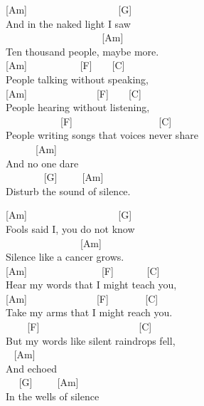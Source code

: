 \documentclass[
  letterpaper,
]{scrbook}
\begin{document}
{[}Am{]} ~ ~ ~ ~ ~ ~ ~ ~ ~ ~ ~{[}G{]}\\
And in the naked light I saw\\
\hspace*{0.333em} ~ ~ ~ ~ ~ ~ ~ ~ ~ ~ ~ ~{[}Am{]}\\
Ten thousand people, maybe more.\\
{[}Am{]} ~ ~ ~ ~ ~ ~ {[}F{]} ~ ~ {[}C{]}\\
People talking without speaking,\\
{[}Am{]} ~ ~ ~ ~ ~ ~ ~ ~ {[}F{]} ~ ~ {[}C{]}\\
People hearing without listening,\\
\hspace*{0.333em} ~ ~ ~ ~ ~ ~ ~{[}F{]} ~ ~ ~ ~ ~ ~ ~ ~ ~ ~ {[}C{]}\\
People writing songs that voices never share\\
\hspace*{0.333em} ~ ~ ~ ~{[}Am{]}\\
And no one dare\\
\hspace*{0.333em} ~ ~ ~ ~ ~{[}G{]} ~ ~ ~{[}Am{]}\\
Disturb the sound of silence.

{[}Am{]} ~ ~ ~ ~ ~ ~ ~ ~ ~ ~ ~{[}G{]}\\
Fools said I, you do not know\\
\hspace*{0.333em} ~ ~ ~ ~ ~ ~ ~ ~ ~ {[}Am{]}\\
Silence like a cancer grows.\\
{[}Am{]} ~ ~ ~ ~ ~ ~ ~ ~ ~{[}F{]} ~ ~ ~ ~{[}C{]}\\
Hear my words that I might teach you,\\
{[}Am{]} ~ ~ ~ ~ ~ ~ ~ ~ {[}F{]} ~ ~ ~ ~ {[}C{]}\\
Take my arms that I might reach you.\\
\hspace*{0.333em} ~ ~ ~{[}F{]} ~ ~ ~ ~ ~ ~ ~ ~ ~ ~ ~ ~{[}C{]}\\
But my words like silent raindrops fell,\\
\hspace*{0.333em} ~ {[}Am{]}\\
And echoed\\
\hspace*{0.333em} ~ ~{[}G{]} ~ ~ ~{[}Am{]}\\
In the wells of silence
\end{document}
